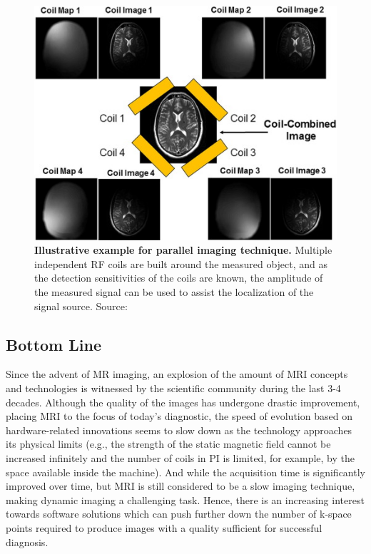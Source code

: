 \begin{figure}[tb]
    \centering
    \includegraphics[width=0.6\linewidth]{images/parallel_imaging.jpg}
    \caption{\textbf{Illustrative example for parallel imaging technique.} Multiple independent RF coils are built around the measured object, and as the detection sensitivities of the coils are known, the amplitude of the measured signal can be used to assist the localization of the signal source. Source:~\cite{hamilton_recent_2017}}
    \label{fig:parallel_imaging}
\end{figure}

\subsection{Bottom Line}
Since the advent of MR imaging, an explosion of the amount of MRI concepts and technologies is witnessed by the scientific community during the last 3-4 decades. Although the quality of the images has undergone drastic improvement, placing MRI to the focus of today's diagnostic, the speed of evolution based on hardware-related innovations seems to slow down as the technology approaches its physical limits (e.g., the strength of the static magnetic field cannot be increased infinitely and the number of coils in PI is limited, for example, by the space available inside the machine). And while the acquisition time is significantly improved over time, but MRI is still considered to be a slow imaging technique, making dynamic imaging a challenging task. Hence, there is an increasing interest towards software solutions which can push further down the number of k-space points required to produce images with a quality sufficient for successful diagnosis.

\clearpage